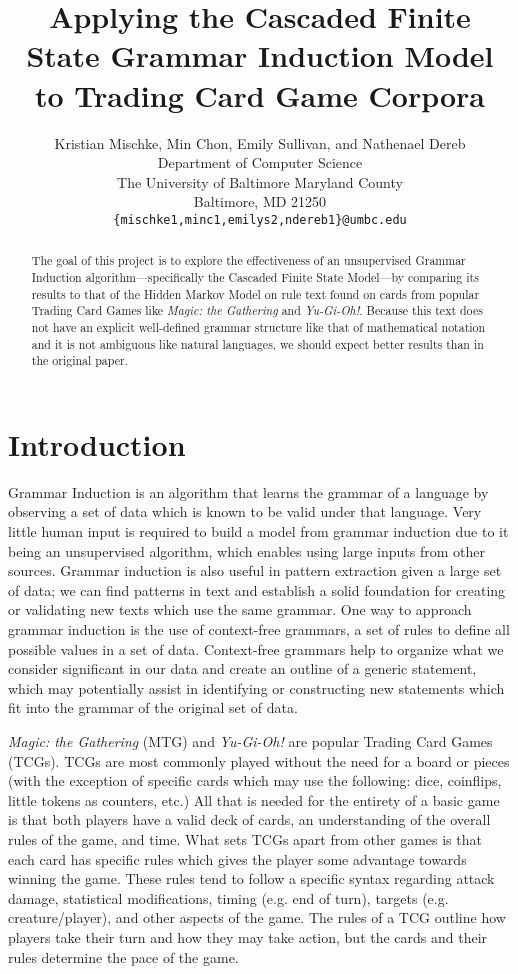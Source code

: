 \documentclass[11pt,a4paper]{article}
\title{Applying the Cascaded Finite State Grammar Induction Model to Trading Card Game Corpora}
\author{Kristian Mischke, Min Chon, Emily Sullivan, and Nathenael Dereb \\
  Department of Computer Science \\
  The University of Baltimore Maryland County \\
  Baltimore, MD 21250 \\
  \texttt{\{mischke1,minc1,emilys2,ndereb1\}@umbc.edu} \\}
\date{}
\begin{document}
\maketitle
\begin{abstract}
The goal of this project is to explore the effectiveness of an unsupervised Grammar Induction algorithm—specifically the Cascaded Finite State Model—by comparing its results to that of the Hidden Markov Model on rule text found on cards from popular Trading Card Games like \emph{Magic: the Gathering} and \emph{Yu-Gi-Oh!}.
Because this text does not have an explicit well-defined grammar structure like that of mathematical notation and it is not ambiguous like natural languages, we should expect better results than in the original paper.

\end{abstract}

\section{Introduction}
Grammar Induction is an algorithm that learns the grammar of a language by observing a set of data which is known to be valid under that language.
Very little human input is required to build a model from grammar induction due to it being an unsupervised algorithm, which enables using large inputs from other sources.
Grammar induction is also useful in pattern extraction given a large set of data; we can find patterns in text and establish a solid foundation for creating or validating new texts which use the same grammar.
One way to approach grammar induction is the use of context-free grammars, a set of rules to define all possible values in a set of data.
Context-free grammars help to organize what we consider significant in our data and create an outline of a generic statement, which may potentially assist in identifying or constructing new statements which fit into the grammar of the original set of data.

\emph{Magic: the Gathering} (MTG) and \emph{Yu-Gi-Oh!} are popular Trading Card Games (TCGs).
TCGs are most commonly played without the need for a board or pieces (with the exception of specific cards which may use the following: dice, coinflips, little tokens as counters, etc.)
All that is needed for the entirety of a basic game is that both players have a valid deck of cards, an understanding of the overall rules of the game, and time.
What sets TCGs apart from other games is that each card has specific rules which gives the player some advantage towards winning the game.
These rules tend to follow a specific syntax regarding attack damage, statistical modifications, timing (e.g. end of turn), targets (e.g. creature/player), and other aspects of the game.
The rules of a TCG outline how players take their turn and how they may take action, but the cards and their rules determine the pace of the game.
\end{document}
